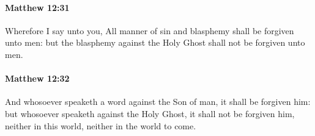 		\paragraph{Matthew 12:31} %
			\label{MATTHEW-12-31}

			Wherefore I say unto you, All manner of sin and blasphemy shall be forgiven unto men: but the blasphemy against the Holy Ghost shall not be forgiven unto men.

			\begin{framed}
			\scriptsize
				\begin{compactdesc}
					\item[SBLG] 
				\end{compactdesc}
			\end{framed}

		\paragraph{Matthew 12:32} %
			\label{MATTHEW-12-32}

			And whosoever speaketh a word against the Son of man, it shall be forgiven him: but whosoever speaketh against the Holy Ghost, it shall not be forgiven him, neither in this world, neither in the world to come.

